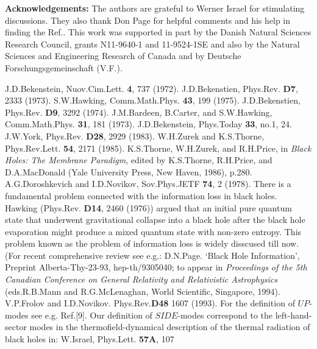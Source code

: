 \documentclass[superscriptaddress,showpacs,preprintnumbers,amsmath,amssymb,
nofootinbib,twocolumn,aps,prd,10pt]{revtex4-1}
\begin{document}
\vspace{1cm}

{\bf Acknowledgements:} The authors are grateful to Werner Israel for
stimulating discussions. They also thank Don Page for helpful comments
and his help in finding the Ref.\cite{Simk:86}.
This work was supported in part by
the Danish Natural Sciences Research Council, grants N11-9640-1 and
11-9524-1SE and also by the Natural Sciences and Engineering Research
of Canada and by Deutsche Forschungsgemeinschaft (V.F.).
\newpage

\begin{thebibliography}{99}

 J.D.Bekenstein, Nuov.Cim.Lett. {\bf 4}, 737 (1972).
 J.D.Bekenstien,  Phys.Rev. {\bf D7}, 2333 (1973).
 S.W.Hawking, Comm.Math.Phys. {\bf 43}, 199 (1975).
 J.D.Bekenstien,  Phys.Rev. {\bf D9}, 3292 (1974).
 J.M.Bardeen, B.Carter, and S.W.Hawking, Comm.Math.Phys.
{\bf 31}, 181 (1973).
 J.D.Bekenstein, Phys.Today {\bf 33}, no.1, 24.
 J.W.York, Phys.Rev. {\bf D28}, 2929 (1983).
 W.H.Zurek and K.S.Thorne, Phys.Rev.Lett. {\bf 54}, 2171
(1985).
 K.S.Thorne, W.H.Zurek, and R.H.Price, in {\em Black
Holes: The Membrane Paradigm}, edited by K.S.Thorne, R.H.Price, and
D.A.MacDonald (Yale University Press, New Haven, 1986), p.280.
 A.G.Doroshkevich and I.D.Novikov, Sov.Phys.JETF {\bf 74},
2 (1978).
 There is a fundamental problem connected with the information
loss in black holes. Hawking (Phys.Rev. {\bf D14}, 2460 (1976))
argued that an initial pure quantum state
that underwent gravitational collapse into a black hole after the
black hole evaporation might produce a mixed quantum state with non-zero
entropy. This problem known as the problem of information loss is
widely disscused till now. (For recent comprehensive review see e.g.:
D.N.Page. `Black Hole Information', Preprint Alberta-Thy-23-93,
hep-th/9305040;
to appear in {\em Proceedings of the 5th Canadian Conference on General
Relativity and Relativistic Astrophysics} (eds.R.B.Mann and R.G.McLenaghan,
World
Scientific, Singapore, 1994).
 V.P.Frolov and I.D.Novikov. Phys.Rev.{\bf D48} 1607 (1993).
 For the definition of $UP$-modes see e.g. Ref.[9]. Our
definition of $SIDE$-modes correspond to the left-hand-sector
modes in the thermofield-dynamical description of the thermal
radiation of black holes in: W.Israel, Phys.Lett. {\bf 57A}, 107

\end{thebibliography}
\end{document}

